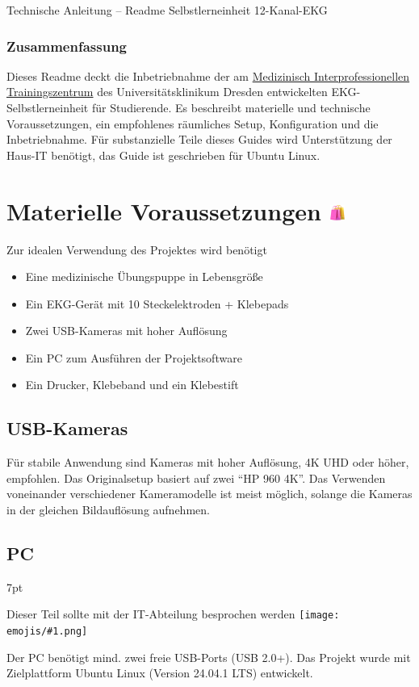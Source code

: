 \documentclass[a4paper, 10pt]{article}
\newcommand{\emoji}[1]{
    \begingroup\normalfont
    \texttt{[image: emojis/\#1.png]}
    \endgroup
}
\newenvironment{tooltip}{%
\small
\vspace*{-4mm}
    \def\FrameCommand{%
    \hspace{1pt}%
    {\color{tooltippipe}\vrule width 0.7mm}%
    {\color{tooltipshade}\vrule width 1.5mm}%
    \colorbox{tooltipshade}%
    }%
    \MakeFramed{\advance\hsize-\width\FrameRestore}%
    \noindent%
    \begin{adjustwidth}{}{7pt}%
    \vspace{2pt}\vspace{2pt}%
}
{%
    \vspace{2pt}\end{adjustwidth}\endMakeFramed%
}
\begin{document}
{ \Huge \noindent Technische Anleitung -- Readme} \newline
{ \LARGE \noindent Selbstlerneinheit 12-Kanal-EKG}

\subsubsection*{Zusammenfassung}
Dieses Readme deckt die Inbetriebnahme der am \href{https://tu-dresden.de/med/mf/mitz}{Medizinisch Interprofessionellen Trainingszentrum} des Universitätsklinikum Dresden entwickelten EKG-Selbstlerneinheit für Studierende. Es beschreibt materielle und technische Voraussetzungen, ein empfohlenes räumliches Setup, Konfiguration und die Inbetriebnahme.
Für substanzielle Teile dieses Guides wird Unterstützung der Haus-IT benötigt, das Guide ist geschrieben für Ubuntu Linux.

\section{Materielle Voraussetzungen {\includegraphics[height=0.65em]{emojis/shopping-bags.png}}}
\label{sec:prerequisites}
Zur idealen Verwendung des Projektes wird benötigt
\begin{itemize}
    \item Eine medizinische Übungspuppe in Lebensgröße
    \item Ein EKG-Gerät mit 10 Steckelektroden + Klebepads
    \item Zwei USB-Kameras mit hoher Auflösung
    \item Ein PC zum Ausführen der Projektsoftware
    \item Ein Drucker, Klebeband und ein Klebestift
\end{itemize}

\subsection{USB-Kameras}
\label{ssec:cameras}
Für stabile Anwendung sind Kameras mit hoher Auflösung, 4K UHD oder höher, empfohlen. Das Originalsetup basiert auf zwei \enquote{HP 960 4K}. Das Verwenden voneinander verschiedener Kameramodelle ist meist möglich, solange die Kameras in der gleichen Bildauflösung aufnehmen.


\subsection{PC}
\label{ssec:pc-reqs}
\begin{tooltip}
    Dieser Teil sollte mit der IT-Abteilung besprochen werden\emoji{technologist}
\end{tooltip}
Der PC benötigt mind. zwei freie USB-Ports (USB 2.0+). Das Projekt wurde mit Zielplattform Ubuntu Linux (Version 24.04.1 LTS) entwickelt.
\end{document}
